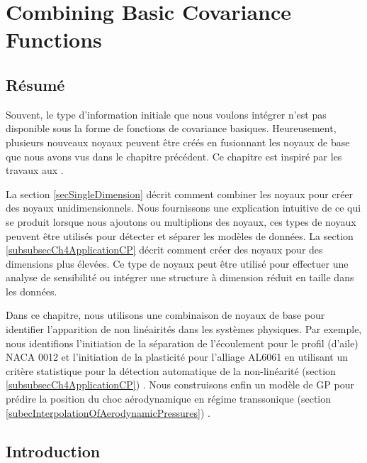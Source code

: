 \chapter{Combining Basic Covariance Functions}
\label{chapCombiningBasicCovariances}

\begin{mdframed}[hidealllines=true,backgroundcolor=lightgray!20]
\section*{Résumé}
Souvent, le type d'information initiale que nous voulons intégrer n'est pas disponible sous la forme de fonctions de covariance basiques. Heureusement, plusieurs nouveaux noyaux peuvent être créés en fusionnant les noyaux de base que nous avons vus dans le chapitre précédent. Ce chapitre est inspiré par les travaux aux  \cite{bishop2006pattern, mackay2003information, durrande2001etude, durrande2013anova}.


La section \ref{secSingleDimension} décrit comment combiner les noyaux pour créer des noyaux unidimensionnels. Nous fournissons une explication intuitive de ce qui se produit lorsque nous ajoutons ou multiplions des noyaux, ces types de noyaux peuvent être utilisés pour détecter et séparer les modèles de données. La section \ref{subsubsecCh4ApplicationCP} décrit comment créer des noyaux pour des dimensions plus élevées. Ce type de noyaux peut être utilisé pour effectuer une analyse de sensibilité ou intégrer une structure à dimension réduit en taille dans les données.

Dans ce chapitre, nous utilisons une combinaison de noyaux de base pour identifier l'apparition de non linéairités dans les systèmes physiques. Par exemple, nous identifions l'initiation de la séparation de l'écoulement pour le profil
(d'aile) NACA 0012 et l'initiation de la plasticité pour l'alliage AL6061 en utilisant un critère statistique pour la détection automatique de la non-linéarité (section \ref{subsubsecCh4ApplicationCP}) \cite{chiplunkar:hal-01555401}. Nous construisons enfin un modèle de GP pour prédire la position du choc aérodynamique en régime transsonique (section \ref{subecInterpolationOfAerodynamicPressures}) \cite{oatao18004}.
\end{mdframed}



\section{Introduction}

